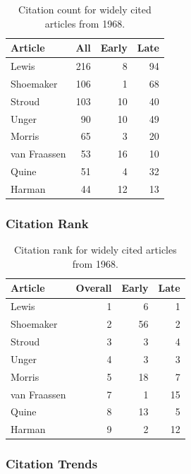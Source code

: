 \documentclass[
  10pt,
  letterpaper,
  DIV=11,
  numbers=noendperiod,
  twoside]{scrartcl}
\begin{document}
\begin{longtable}[]{@{}lrrr@{}}

\caption{\label{tbl-citation-count-1968}Citation count for widely cited
articles from 1968.}

\tabularnewline

\toprule\noalign{}
Article & All & Early & Late \\
\midrule\noalign{}
\endhead
\bottomrule\noalign{}
\endlastfoot
Lewis & 216 & 8 & 94 \\
Shoemaker & 106 & 1 & 68 \\
Stroud & 103 & 10 & 40 \\
Unger & 90 & 10 & 49 \\
Morris & 65 & 3 & 20 \\
van Fraassen & 53 & 16 & 10 \\
Quine & 51 & 4 & 32 \\
Harman & 44 & 12 & 13 \\

\end{longtable}

\subsubsection*{Citation Rank}\label{sec-rank-1968}

\begin{longtable}[]{@{}lrrr@{}}

\caption{\label{tbl-citation-rank-1968}Citation rank for widely cited
articles from 1968.}

\tabularnewline

\toprule\noalign{}
Article & Overall & Early & Late \\
\midrule\noalign{}
\endhead
\bottomrule\noalign{}
\endlastfoot
Lewis & 1 & 6 & 1 \\
Shoemaker & 2 & 56 & 2 \\
Stroud & 3 & 3 & 4 \\
Unger & 4 & 3 & 3 \\
Morris & 5 & 18 & 7 \\
van Fraassen & 7 & 1 & 15 \\
Quine & 8 & 13 & 5 \\
Harman & 9 & 2 & 12 \\

\end{longtable}

\subsubsection*{Citation Trends}\label{sec-trends-1968}
\end{document}
